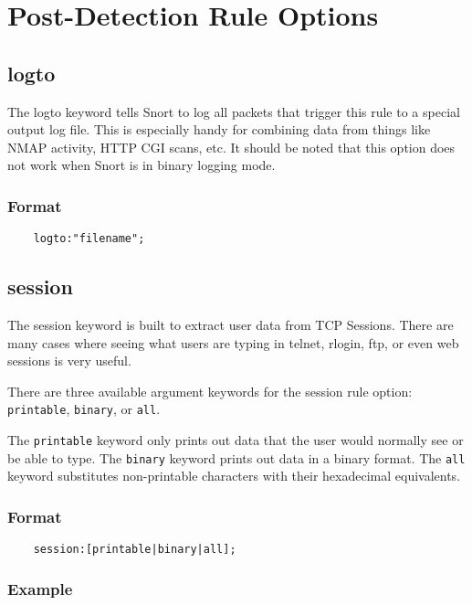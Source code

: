 \documentclass[english]{report}
\begin{document}
\section{Post-Detection Rule Options}
\subsection{logto}

The logto keyword tells Snort to log all packets that trigger this rule to a
special output log file. This is especially handy for combining data from
things like NMAP activity, HTTP CGI scans, etc. It should be noted that this
option does not work when Snort is in binary logging mode.

\subsubsection{Format}

\begin{verbatim}
    logto:"filename";
\end{verbatim}

\subsection{session}

The session keyword is built to extract user data from TCP Sessions.  There are
many cases where seeing what users are typing in telnet, rlogin, ftp, or even
web sessions is very useful. 

There are three available argument keywords for the session rule option:
\texttt{printable}, \texttt{binary}, or \texttt{all}.

The \texttt{printable} keyword only prints out data that the user
would normally see or be able to type.  The \texttt{binary} keyword prints out data in a
binary format. The \texttt{all} keyword substitutes non-printable characters with
their hexadecimal equivalents. 

\subsubsection{Format}

\begin{verbatim}
    session:[printable|binary|all];
\end{verbatim}

\subsubsection{Example}
\end{document}
